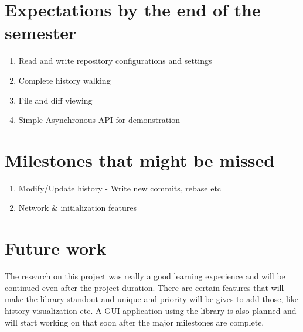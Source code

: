 \section{Expectations by the end of the semester}

\begin{enumerate}

	\item Read and write repository configurations and settings
    \item Complete history walking
    \item File and diff viewing
    \item Simple Asynchronous API for demonstration

\end{enumerate}

\section{Milestones that  might be missed}


\begin{enumerate}

	\item Modify/Update history - Write new commits, rebase etc
    \item Network \& initialization features

\end{enumerate}

\section{Future work}

The research on this project was really a good learning experience and will be
continued even after the project duration. There are certain features that will
make the library standout and unique and priority will be gives to add those,
like history visualization etc. A GUI application using the library is also
planned and will start working on that soon after the major milestones are
complete.
